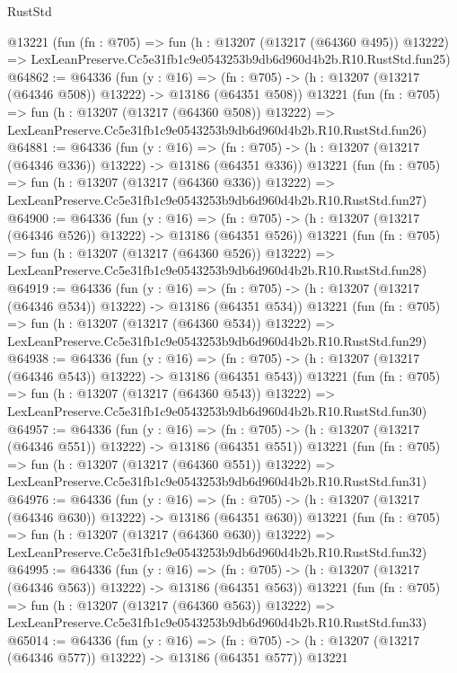 \begin{lexlean}{RustStd}
\begin{coremodule}
    @13221
    (fun (fn : @705) =>
    fun (h : @13207 (@13217 (@64360 @495)) @13222) =>
    LexLeanPreserve.Cc5e31fb1c9e0543253b9db6d960d4b2b.R10.RustStd.fun25)
@64862 := @64336
    (fun (y : @16) =>
    (fn : @705) -> (h : @13207 (@13217 (@64346 @508)) @13222) -> @13186 (@64351 @508))
    @13221
    (fun (fn : @705) =>
    fun (h : @13207 (@13217 (@64360 @508)) @13222) =>
    LexLeanPreserve.Cc5e31fb1c9e0543253b9db6d960d4b2b.R10.RustStd.fun26)
@64881 := @64336
    (fun (y : @16) =>
    (fn : @705) -> (h : @13207 (@13217 (@64346 @336)) @13222) -> @13186 (@64351 @336))
    @13221
    (fun (fn : @705) =>
    fun (h : @13207 (@13217 (@64360 @336)) @13222) =>
    LexLeanPreserve.Cc5e31fb1c9e0543253b9db6d960d4b2b.R10.RustStd.fun27)
@64900 := @64336
    (fun (y : @16) =>
    (fn : @705) -> (h : @13207 (@13217 (@64346 @526)) @13222) -> @13186 (@64351 @526))
    @13221
    (fun (fn : @705) =>
    fun (h : @13207 (@13217 (@64360 @526)) @13222) =>
    LexLeanPreserve.Cc5e31fb1c9e0543253b9db6d960d4b2b.R10.RustStd.fun28)
@64919 := @64336
    (fun (y : @16) =>
    (fn : @705) -> (h : @13207 (@13217 (@64346 @534)) @13222) -> @13186 (@64351 @534))
    @13221
    (fun (fn : @705) =>
    fun (h : @13207 (@13217 (@64360 @534)) @13222) =>
    LexLeanPreserve.Cc5e31fb1c9e0543253b9db6d960d4b2b.R10.RustStd.fun29)
@64938 := @64336
    (fun (y : @16) =>
    (fn : @705) -> (h : @13207 (@13217 (@64346 @543)) @13222) -> @13186 (@64351 @543))
    @13221
    (fun (fn : @705) =>
    fun (h : @13207 (@13217 (@64360 @543)) @13222) =>
    LexLeanPreserve.Cc5e31fb1c9e0543253b9db6d960d4b2b.R10.RustStd.fun30)
@64957 := @64336
    (fun (y : @16) =>
    (fn : @705) -> (h : @13207 (@13217 (@64346 @551)) @13222) -> @13186 (@64351 @551))
    @13221
    (fun (fn : @705) =>
    fun (h : @13207 (@13217 (@64360 @551)) @13222) =>
    LexLeanPreserve.Cc5e31fb1c9e0543253b9db6d960d4b2b.R10.RustStd.fun31)
@64976 := @64336
    (fun (y : @16) =>
    (fn : @705) -> (h : @13207 (@13217 (@64346 @630)) @13222) -> @13186 (@64351 @630))
    @13221
    (fun (fn : @705) =>
    fun (h : @13207 (@13217 (@64360 @630)) @13222) =>
    LexLeanPreserve.Cc5e31fb1c9e0543253b9db6d960d4b2b.R10.RustStd.fun32)
@64995 := @64336
    (fun (y : @16) =>
    (fn : @705) -> (h : @13207 (@13217 (@64346 @563)) @13222) -> @13186 (@64351 @563))
    @13221
    (fun (fn : @705) =>
    fun (h : @13207 (@13217 (@64360 @563)) @13222) =>
    LexLeanPreserve.Cc5e31fb1c9e0543253b9db6d960d4b2b.R10.RustStd.fun33)
@65014 := @64336
    (fun (y : @16) =>
    (fn : @705) -> (h : @13207 (@13217 (@64346 @577)) @13222) -> @13186 (@64351 @577))
    @13221

\end{coremodule}
\end{lexlean}
